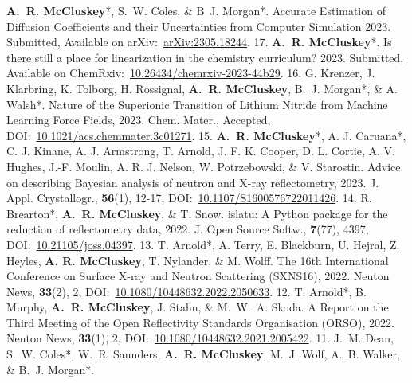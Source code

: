\begin{cvpubys}
   \cvpuby
    {\textbf{A.~R. McCluskey}*, S.~W. Coles, \& B~J. Morgan*.}
    {Accurate Estimation of Diffusion Coefficients and their Uncertainties from Computer Simulation}
    {2023.}
    {Submitted,}
    {}
    {Available on arXiv:~\href{https://arxiv.org/abs/2305.18244}{arXiv:2305.18244}.}
    {17.}
   \cvpuby
    {\textbf{A.~R. McCluskey}*.}
    {Is there still a place for linearization in the chemistry curriculum?}
    {2023.}
    {Submitted,}
    {}
    {Available on ChemRxiv:~\href{https://doi.org/10.26434/chemrxiv-2023-44b29}{10.26434/chemrxiv-2023-44b29}.}
    {16.}
  \cvpuby
    {G. Krenzer, J. Klarbring, K. Tolborg, H. Rossignal, \textbf{A.~R. McCluskey}, B.~J. Morgan*, \& A. Walsh*.}
    {Nature of the Superionic Transition of Lithium Nitride from Machine Learning Force Fields,}
    {2023.}
    {Chem. Mater.,}
    {Accepted,}
    {DOI:~\href{https://doi.org/10.1021/acs.chemmater.3c01271}{10.1021/acs.chemmater.3c01271}.}
    {15.}
  \cvpuby
    {\textbf{A.~R. McCluskey}*, A. J. Caruana*, C. J. Kinane, A. J. Armstrong, T. Arnold, J. F. K. Cooper, D. L. Cortie, A. V. Hughes, J.-F. Moulin, A. R. J. Nelson, W. Potrzebowski, \& V. Starostin.}
    {Advice on describing Bayesian analysis of neutron and X-ray reflectometry,}
    {2023.}
    {J. Appl. Crystallogr.,}
    {\textbf{56}(1), 12-17,}
    {DOI:~\href{https://doi.org/10.1107/S1600576722011426}{10.1107/S1600576722011426}.}
    {14.}
  \cvpuby
    {R. Brearton*, \textbf{A.~R. McCluskey}, \& T. Snow.}
    {islatu: A Python package for the reduction of reflectometry data,}
    {2022.}
    {J. Open Source Softw.,}
    {\textbf{7}(77), 4397,}
    {DOI:~\href{https://doi.org/10.21105/joss.04397}{10.21105/joss.04397}.}
    {13.}
  \cvpuby
    {T. Arnold*, A. Terry, E. Blackburn, U. Hejral, Z. Heyles, \textbf{A. R. McCluskey}, T. Nylander, \& M. Wolff.}
    {The 16th International Conference on Surface X-ray and Neutron Scattering (SXNS16),}
    {2022.}
    {Neuton News,}
    {\textbf{33}(2), 2,}
    {DOI:~\href{https://doi.org/10.1080/10448632.2022.2050633}{10.1080/10448632.2022.2050633}.}
    {12.}
  \cvpuby
    {T. Arnold*, B. Murphy, \textbf{A.~R. McCluskey}, J. Stahn, \& M.~W.~A. Skoda.}
    {A Report on the Third Meeting of the Open Reflectivity Standards Organisation (ORSO),}
    {2022.}
    {Neuton News,}
    {\textbf{33}(1), 2,}
    {DOI:~\href{https://doi.org/10.1080/10448632.2021.2005422}{10.1080/10448632.2021.2005422}.}
    {11.}
  \cvpuby
    {J.~M. Dean, S.~W. Coles*, W.~R. Saunders, \textbf{A.~R. McCluskey}, M.~J. Wolf, A.~B. Walker, \& B.~J. Morgan*.}

\end{cvpubys}
